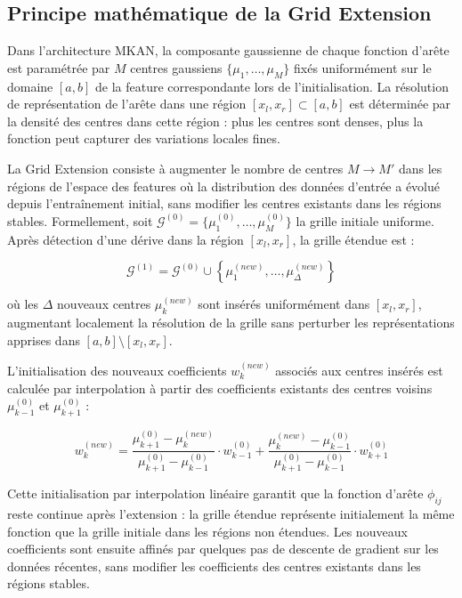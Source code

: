 \documentclass[11pt,a4paper,oneside]{report}
\theoremstyle{definition}
\theoremstyle{remark}
\begin{document}
\subsection{Principe mathématique de la Grid Extension}

Dans l'architecture MKAN, la composante gaussienne de chaque fonction d'arête est paramétrée par $M$ centres gaussiens $\{\mu_1, \ldots, \mu_M\}$ fixés uniformément sur le domaine $[a, b]$ de la feature correspondante lors de l'initialisation. La résolution de représentation de l'arête dans une région $[x_l, x_r] \subset [a, b]$ est déterminée par la densité des centres dans cette région : plus les centres sont denses, plus la fonction peut capturer des variations locales fines.

La Grid Extension consiste à augmenter le nombre de centres $M \rightarrow M'$ dans les régions de l'espace des features où la distribution des données d'entrée a évolué depuis l'entraînement initial, sans modifier les centres existants dans les régions stables. Formellement, soit $\mathcal{G}^{(0)} = \{\mu_1^{(0)}, \ldots, \mu_M^{(0)}\}$ la grille initiale uniforme. Après détection d'une dérive dans la région $[x_l, x_r]$, la grille étendue est :

\begin{equation}
    \mathcal{G}^{(1)} = \mathcal{G}^{(0)} \cup \left\{\mu_1^{(new)}, \ldots, \mu_\Delta^{(new)}\right\}
\end{equation}

où les $\Delta$ nouveaux centres $\mu_k^{(new)}$ sont insérés uniformément dans $[x_l, x_r]$, augmentant localement la résolution de la grille sans perturber les représentations apprises dans $[a, b] \setminus [x_l, x_r]$.

L'initialisation des nouveaux coefficients $w_k^{(new)}$ associés aux centres insérés est calculée par interpolation à partir des coefficients existants des centres voisins $\mu_{k-1}^{(0)}$ et $\mu_{k+1}^{(0)}$ :

\begin{equation}
    w_k^{(new)} =
    \frac{\mu_{k+1}^{(0)} - \mu_k^{(new)}}{\mu_{k+1}^{(0)} - \mu_{k-1}^{(0)}} \cdot w_{k-1}^{(0)}
    +
    \frac{\mu_k^{(new)} - \mu_{k-1}^{(0)}}{\mu_{k+1}^{(0)} - \mu_{k-1}^{(0)}} \cdot w_{k+1}^{(0)}
\end{equation}

Cette initialisation par interpolation linéaire garantit que la fonction d'arête $\phi_{ij}$ reste continue après l'extension : la grille étendue représente initialement la même fonction que la grille initiale dans les régions non étendues. Les nouveaux coefficients sont ensuite affinés par quelques pas de descente de gradient sur les données récentes, sans modifier les coefficients des centres existants dans les régions stables.
\end{document}
